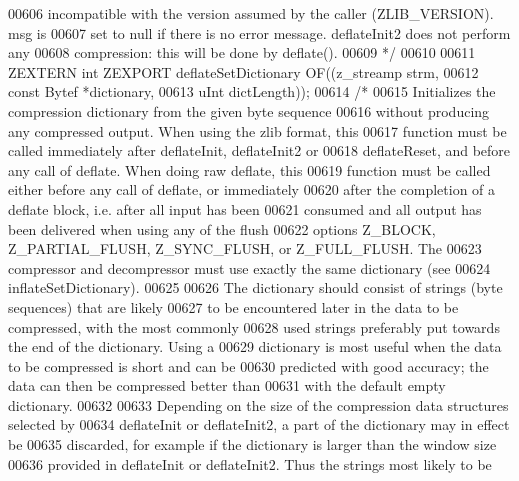 \begin{DoxyCode}
00606 \textcolor{comment}{   incompatible with the version assumed by the caller (ZLIB\_VERSION).  msg is}
00607 \textcolor{comment}{   set to null if there is no error message.  deflateInit2 does not perform any}
00608 \textcolor{comment}{   compression: this will be done by deflate().}
00609 \textcolor{comment}{*/}
00610 
00611 ZEXTERN \textcolor{keywordtype}{int} ZEXPORT deflateSetDictionary OF((z\_streamp strm,
00612                                              \textcolor{keyword}{const} Bytef *dictionary,
00613                                              uInt  dictLength));
00614 \textcolor{comment}{/*}
00615 \textcolor{comment}{     Initializes the compression dictionary from the given byte sequence}
00616 \textcolor{comment}{   without producing any compressed output.  When using the zlib format, this}
00617 \textcolor{comment}{   function must be called immediately after deflateInit, deflateInit2 or}
00618 \textcolor{comment}{   deflateReset, and before any call of deflate.  When doing raw deflate, this}
00619 \textcolor{comment}{   function must be called either before any call of deflate, or immediately}
00620 \textcolor{comment}{   after the completion of a deflate block, i.e. after all input has been}
00621 \textcolor{comment}{   consumed and all output has been delivered when using any of the flush}
00622 \textcolor{comment}{   options Z\_BLOCK, Z\_PARTIAL\_FLUSH, Z\_SYNC\_FLUSH, or Z\_FULL\_FLUSH.  The}
00623 \textcolor{comment}{   compressor and decompressor must use exactly the same dictionary (see}
00624 \textcolor{comment}{   inflateSetDictionary).}
00625 \textcolor{comment}{}
00626 \textcolor{comment}{     The dictionary should consist of strings (byte sequences) that are likely}
00627 \textcolor{comment}{   to be encountered later in the data to be compressed, with the most commonly}
00628 \textcolor{comment}{   used strings preferably put towards the end of the dictionary.  Using a}
00629 \textcolor{comment}{   dictionary is most useful when the data to be compressed is short and can be}
00630 \textcolor{comment}{   predicted with good accuracy; the data can then be compressed better than}
00631 \textcolor{comment}{   with the default empty dictionary.}
00632 \textcolor{comment}{}
00633 \textcolor{comment}{     Depending on the size of the compression data structures selected by}
00634 \textcolor{comment}{   deflateInit or deflateInit2, a part of the dictionary may in effect be}
00635 \textcolor{comment}{   discarded, for example if the dictionary is larger than the window size}
00636 \textcolor{comment}{   provided in deflateInit or deflateInit2.  Thus the strings most likely to be}

\end{DoxyCode}
